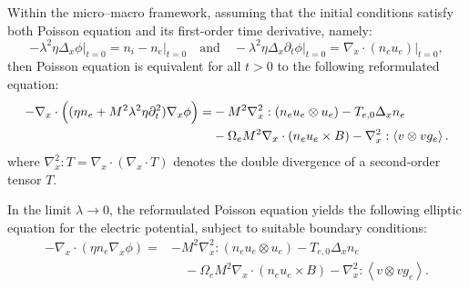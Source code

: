 \documentclass[10pt,a4paper]{amsart}
\newcommand{\Fabrice}[1]{#1}
\begin{document}
\begin{proposition} \label{prop2.2}
Within the micro--macro framework, assuming that the initial conditions satisfy both Poisson equation and its first-order time derivative, namely:
\begin{equation} \label{eq:init_cond}
    -\lambda^2\eta\Delta_x\phi\vert_{t=0} = n_i - n_e\vert_{t=0} \quad \text{and} \quad -\lambda^2\eta\Delta_x\partial_t\phi\vert_{t=0} = \nabla_x\cdot(n_e u_e)\vert_{t=0},
\end{equation}
then Poisson equation is equivalent for all $t > 0$ to the following reformulated equation:
\begin{align} \label{eq:poisson_reformulated}
    -\nabla_x\cdot\Big((\Fabrice{\eta}n_e+M^2\lambda^2\eta\partial_t^2)\nabla_x\phi\Big) = &- M^2\nabla_x^2:(n_eu_e\otimes u_e)-T_{e,0}\Fabrice{\Delta_x}n_e \\ &\Fabrice{ - \Omega_e M^2 \nabla_x \cdot (n_e u_e \times B )} - \nabla_x^2:\left< v\otimes vg_e \right>. \notag
\end{align}
where $\nabla_x^2 : T = \nabla_x \cdot (\nabla_x \cdot T)$ denotes the double divergence of a second-order tensor $T$.

In the limit $\lambda\to0$, the reformulated Poisson equation yields the following elliptic equation for the electric potential, subject to suitable boundary conditions:
\begin{align*}
    -\nabla_x\cdot(\Fabrice{\eta}n_e\nabla_x\phi) = &- M^2\nabla_x^2:(n_eu_e\otimes u_e)-T_{e,0}\Fabrice{\Delta_x}n_e \\
   &\quad \Fabrice{ - \Omega_e M^2 \nabla_x \cdot (n_e u_e \times B )} - \nabla_x^2:\left< v\otimes vg_e \right>.
\end{align*}
\end{proposition}
\end{document}
